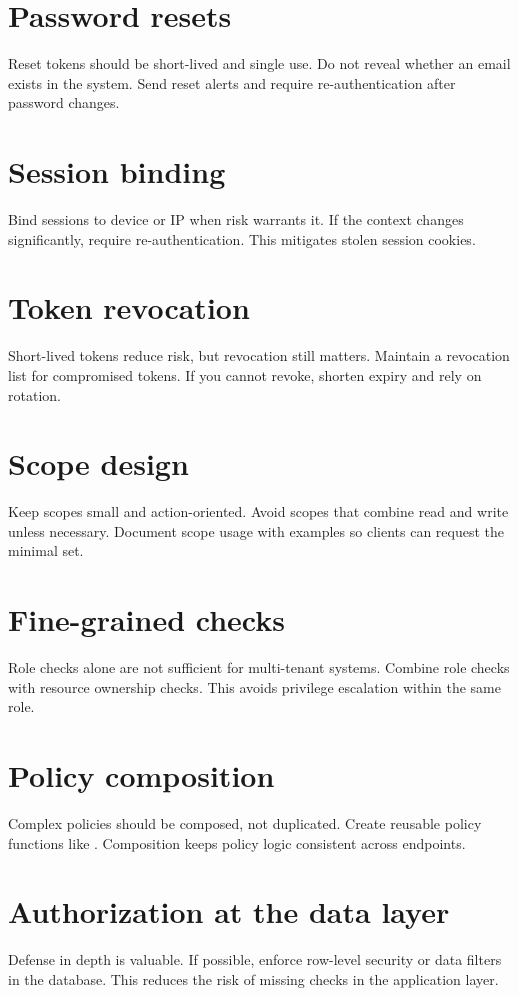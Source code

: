 \section{Password resets}
Reset tokens should be short-lived and single use.
Do not reveal whether an email exists in the system.
Send reset alerts and require re-authentication after password changes.

\section{Session binding}
Bind sessions to device or IP when risk warrants it.
If the context changes significantly, require re-authentication.
This mitigates stolen session cookies.

\section{Token revocation}
Short-lived tokens reduce risk, but revocation still matters.
Maintain a revocation list for compromised tokens.
If you cannot revoke, shorten expiry and rely on rotation.

\section{Scope design}
Keep scopes small and action-oriented.
Avoid scopes that combine read and write unless necessary.
Document scope usage with examples so clients can request the minimal set.

\section{Fine-grained checks}
Role checks alone are not sufficient for multi-tenant systems.
Combine role checks with resource ownership checks.
This avoids privilege escalation within the same role.

\section{Policy composition}
Complex policies should be composed, not duplicated.
Create reusable policy functions like .
Composition keeps policy logic consistent across endpoints.

\section{Authorization at the data layer}
Defense in depth is valuable.
If possible, enforce row-level security or data filters in the database.
This reduces the risk of missing checks in the application layer.

